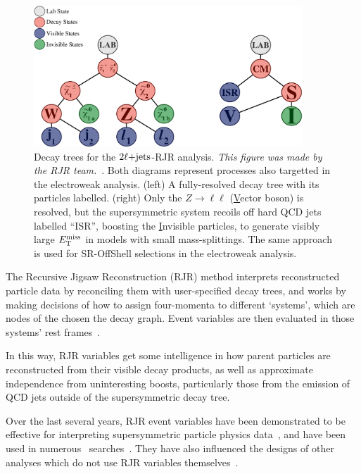 \begin{figure}[tp]
\centering
\includegraphics[width=0.9\textwidth]{figures/2ljets_rjr_trees.pdf}
\caption{%
Decay trees for the $2\ell\mathrm{+jets}$-RJR analysis.
\emph{This figure was made by the RJR team.}~\cite{atlas2022searches}.
Both diagrams represent processes also targetted in the electroweak analysis.
(left) A fully-resolved decay tree with its particles labelled.
(right) Only the $Z\rightarrow\ell\ell$ (\underline{V}ector boson)
is resolved, but the supersymmetric system recoils off
hard QCD jets labelled ``ISR'', boosting the \underline{I}nvisible particles,
to generate visibly large $E_\mathrm{T}^\mathrm{miss}$ in models with small mass-splittings.
The same approach is used for SR-OffShell selections in the electroweak
analysis.
}
\label{fig:2ljets_rjr_decay_trees}
\end{figure}

The Recursive Jigsaw Reconstruction (RJR) method interprets reconstructed
particle data by reconciling them with user-specified decay trees, and works
by making decisions of how to assign four-momenta to different `systems',
which are nodes of the chosen the decay graph.
Event variables are then evaluated in those systems' rest
frames~\cite{jackson2017sparticles, jackson2017rjr}.

In this way, RJR variables get some intelligence in how parent particles are
reconstructed from their visible decay products, as well as approximate
independence from uninteresting boosts, particularly those from the emission of
QCD jets outside of the supersymmetric decay tree.

Over the last several years, RJR event variables have been demonstrated to be
effective for interpreting supersymmetric particle physics
data~\cite{santoni2018probing},
and have been used in numerous \atlas\ searches~\cite{%
atlas_rjr_SUSY_2016_07,
atlas_rjr_SUSY_2016_15,
atlas_rjr_SUSY_2016_16,
atlas_rjr_23l_SUSY_2017_03,
atlas_rjr_SUSY_2018_12,
atlas_rjr_EXOT_2019_19,
atlas_rjr_3l_SUSY_2019_09
}.
They have also influenced the designs of other analyses which do not use
RJR variables themselves~\cite{atlas_rjr_mimic_SUSY_2018_06}.


